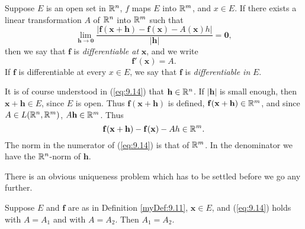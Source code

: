 \begin{myDef}
    \label{myDef:9.11}
    Suppose $E$ is an open set in ${\protect\mathbb R}^n$, $f$ maps $E$ into ${\protect\mathbb R}^m$, and $x \in E$.
    If there exists a linear transformation $A$ of ${\protect\mathbb R}^n$ into ${\protect\mathbb R}^m$ such that
    \begin{equation}
        \label{eq:9.14}
        \lim_{\mathbf{h} \to \mathbf{0}} \frac{\left| \mathbf{f}\mathbf{(x+h)} - \mathbf{f}\mathbf{(x)} - A\mathbf{(x)}h \right|}{\left| \mathbf{h} \right|} = \mathbf{0},
    \end{equation}
    then we say that $\mathbf{f}$ is \emph{differentiable at} $\mathbf{x}$, and we write
    \begin{equation}
        \label{eq:9.15}
        \mathbf{f}'(\mathbf{x}) = A.
    \end{equation}
    If $\mathbf{f}$ is differentiable at every $x \in E$, 
    we say that $\mathbf{f}$ is \emph{differentiable in} $E$.
\end{myDef}

It is of course understood in (\ref{eq:9.14}) that $\mathbf{h} \in {\protect\mathbb R}^n$. 
If $\left| \mathbf{h} \right|$ is small enough, 
then $\mathbf{x+h} \in E$, since $E$ is open. 
Thus $\mathbf{f(x + h)}$ is defined, $\mathbf{f(x + h)} \in {\protect\mathbb R}^m$, 
and since $A \in L({\protect\mathbb R}^n, {\protect\mathbb R}^m)$, $A \mathbf{h} \in {\protect\mathbb R}^m$. 
Thus
\begin{equation*}
    \mathbf{f(x + h)} - \mathbf{f(x)} - A{h} \in {\protect\mathbb R}^m.
\end{equation*}
The norm in the numerator of (\ref{eq:9.14}) is that of ${\protect\mathbb R}^m$. 
In the denominator we have the ${\protect\mathbb R}^n$-norm of $\mathbf{h}$.

There is an obvious uniqueness problem which has to be settled before we go any further.

\begin{thm}
    \label{thm:9.12}
    Suppose $E$ and $\mathbf{f}$ are as in Definition \ref{myDef:9.11}, 
    $\mathbf{x} \in E$, and (\ref{eq:9.14}) holds with $A = A_1$ and with $A = A_2$. 
    Then $A_1 = A_2$.
\end{thm}


